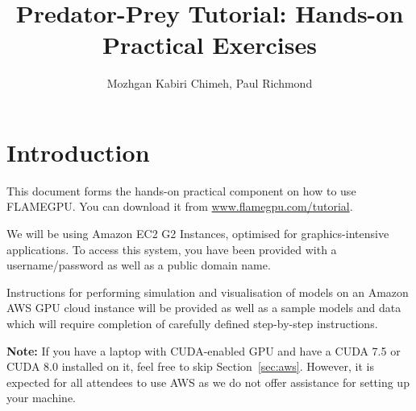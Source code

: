 \documentclass{article}
\begin{document}
\title{Predator-Prey Tutorial: Hands-on Practical Exercises}
\author{Mozhgan Kabiri Chimeh, Paul Richmond}
\date{}





\maketitle

\lstset{numbers=none,
frame=none,
basicstyle=\ttfamily\footnotesize,
commentstyle=\scriptsize,
xleftmargin=2.2em,
columns=fullflexible,
breakatwhitespace=false,         
breaklines=true,                 
captionpos=b,                    
keepspaces=true,
numbersep=5pt,                  
showspaces=false,                
showstringspaces=false,
showtabs=false,                  
tabsize=2,
escapechar=\&}

\section{Introduction}

This document forms the hands-on practical component on how to use FLAMEGPU. You can download it from \href{www.flamegpu.com/tutorial}{www.flamegpu.com/tutorial}.

We will be using Amazon EC2 G2 Instances, optimised for graphics-intensive applications. To access this system, you have been provided with a username/password as well as a public domain name. 

Instructions for performing simulation and visualisation of models on an Amazon AWS GPU cloud instance will be provided as well as a sample models and data which will require completion of carefully defined step-by-step instructions. 

\textbf{Note:} If you have a laptop with CUDA-enabled GPU and have a CUDA 7.5 or CUDA 8.0 installed on it, feel free to skip Section~\ref{sec:aws}. However, it is expected for all attendees to use AWS as we do not offer assistance for setting up your machine.


\newpage

\newpage




\end{document}
